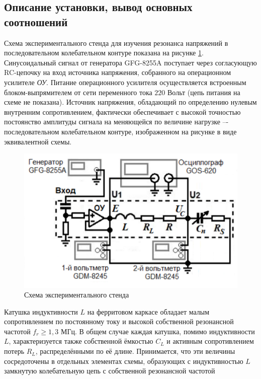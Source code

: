 \documentclass[a4paper, 12pt]{article}
\begin{document}
    \subsection{Описание установки, вывод основных соотношений}

    Схема экспериментального стенда для изучения резонанса напряжений в последовательном колебательном контуре показана на рисунке \ref{installation}. Синусоидальный сигнал от генератора GFG-8255A поступает через согласующую RC-цепочку на вход источника напряжения, собранного на операционном усилителе \textit{ОУ}. Питание операционного усилителя осуществляется встроенным блоком-выпрямителем от сети переменного тока $220$ Вольт (цепь питания на схеме не показана). Источник напряжения, обладающий по определению нулевым внутренним сопротивлением, фактически обеспечивает с высокой точностью постоянство амплитуды сигнала на меняющейся по величине нагрузке –- последовательном колебательном контуре, изображенном на рисунке в виде эквивалентной схемы.

    \begin{figure}[H]
        \centering
        \includegraphics{images/installation.png}
        \caption{Схема экспериментального стенда}
        \label{installation}
    \end{figure}

    Катушка индуктивности $L$ на ферритовом каркасе обладает малым сопротивлением по постоянному току и высокой собственной резонансной частотой $f_r \geq 1,3$ МГц. В общем случае каждая катушка, помимо индуктивности $L$, характеризуется также собственной ёмкостью $C_L$ и активным сопротивлением потерь $R_L$, распределёнными по её длине. Принимается, что эти величины сосредоточены в отдельных элементах схемы, образующих с индуктивностью $L$ замкнутую колебательную цепь с собственной резонансной частотой 
    
\end{document}
